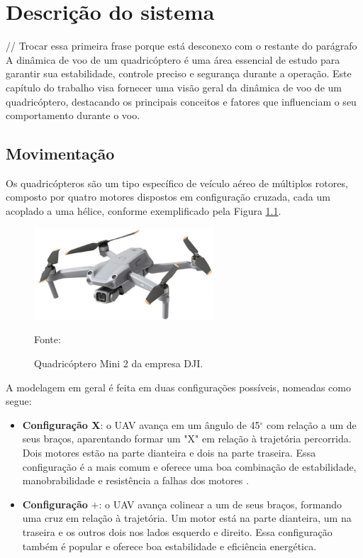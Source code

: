 \documentclass[main.tex]{subfiles}
\begin{document}
\chapter{Descrição do sistema}\label{cap:descricao}

\textcolor{estranho}{// Trocar essa primeira frase porque está desconexo com o restante do parágrafo}
A dinâmica de voo de um quadricóptero é uma área essencial de estudo para garantir sua estabilidade, controle preciso e segurança durante a operação. Este capítulo do trabalho visa fornecer uma visão geral da dinâmica de voo de um quadricóptero, destacando os principais conceitos e fatores que influenciam o seu comportamento durante o voo.

\section{Movimentação}

Os quadricópteros são um tipo específico de veículo aéreo de múltiplos rotores, composto por quatro motores dispostos em configuração cruzada, cada um acoplado a uma hélice, conforme exemplificado pela Figura \ref{fig:mini2}. 

\begin{figure}[!h]
    \centering
    \caption{Quadricóptero Mini 2 da empresa DJI.}
    \includegraphics[width=0.6\textwidth]{capitulos/descricao/imgs/mini2.png}
    \begin{flushleft}
        \small{Fonte: \cite{dji}}
	\end{flushleft}
    \label{fig:mini2}
\end{figure}

A modelagem em geral é feita em duas configurações possíveis, nomeadas como segue:

\begin{itemize}
    \item \textbf{Configuração X}: o UAV avança em um ângulo de 45$^\circ$ com relação a um de seus braços, aparentando formar um "X" em relação à trajetória percorrida. Dois motores estão na parte dianteira e dois na parte traseira. Essa configuração é a mais comum e oferece uma boa combinação de estabilidade, manobrabilidade e resistência a falhas dos motores \cite{configuracoes}.
    \item \textbf{Configuração} $\boldsymbol{+}$: o UAV avança colinear a um de seus braços, formando uma cruz em relação à trajetória. Um motor está na parte dianteira, um na traseira e os outros dois nos lados esquerdo e direito. Essa configuração também é popular e oferece boa estabilidade e eficiência energética.
\end{itemize}
\end{document}
